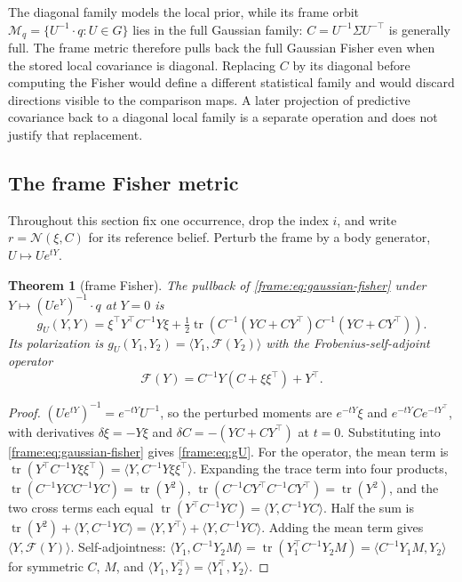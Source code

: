 \documentclass[11pt]{article}
\newtheorem{theorem}{Theorem}[section]
\theoremstyle{definition}
\theoremstyle{remark}
\providecommand{\tr}{\operatorname{tr}}
\providecommand{\Normal}{\mathcal{N}}
\providecommand{\ip}[2]{\langle #1, #2\rangle}
\begin{document}
The diagonal family models the local prior, while its frame orbit \(\mathcal M_q=\{U^{-1}\cdot q:U\in G\}\) lies in the full Gaussian family: \(C=U^{-1}\Sigma U^{-\top}\) is generally full. The frame metric therefore pulls back the full Gaussian Fisher even when the stored local covariance is diagonal. Replacing \(C\) by its diagonal before computing the Fisher would define a different statistical family and would discard directions visible to the comparison maps. A later projection of predictive covariance back to a diagonal local family is a separate operation and does not justify that replacement.

\subsection{The frame Fisher metric}\label{frame:sec:fisher}

Throughout this section fix one occurrence, drop the index $i$, and write $r=\Normal(\xi,C)$ for its reference belief. Perturb the frame by a body generator, $U\mapsto Ue^{tY}$.

\begin{theorem}[frame Fisher]\label{frame:thm:fisher}
The pullback of \eqref{frame:eq:gaussian-fisher} under $Y\mapsto(Ue^{Y})^{-1}\cdot q$ at $Y=0$ is
\begin{equation}\label{frame:eq:gU}
g_U(Y,Y)=\xi^\top Y^\top C^{-1}Y\xi+\tfrac12\tr\left(C^{-1}(YC+CY^\top)C^{-1}(YC+CY^\top)\right).
\end{equation}
Its polarization is $g_U(Y_1,Y_2)=\ip{Y_1}{\mathcal{F}(Y_2)}$ with the Frobenius-self-adjoint operator
\begin{equation}\label{frame:eq:F}
\mathcal{F}(Y)=C^{-1}Y(C+\xi\xi^\top)+Y^\top.
\end{equation}
\end{theorem}
\begin{proof}
$(Ue^{tY})^{-1}=e^{-tY}U^{-1}$, so the perturbed moments are $e^{-tY}\xi$ and $e^{-tY}Ce^{-tY^\top}$, with derivatives $\delta\xi=-Y\xi$ and $\delta C=-(YC+CY^\top)$ at $t=0$. Substituting into \eqref{frame:eq:gaussian-fisher} gives \eqref{frame:eq:gU}. For the operator, the mean term is $\tr(Y^\top C^{-1}Y\xi\xi^\top)=\ip{Y}{C^{-1}Y\xi\xi^\top}$. Expanding the trace term into four products, $\tr(C^{-1}YCC^{-1}YC)=\tr(Y^2)$, $\tr(C^{-1}CY^\top C^{-1}CY^\top)=\tr(Y^2)$, and the two cross terms each equal $\tr(Y^\top C^{-1}YC)=\ip{Y}{C^{-1}YC}$. Half the sum is $\tr(Y^2)+\ip{Y}{C^{-1}YC}=\ip{Y}{Y^\top}+\ip{Y}{C^{-1}YC}$. Adding the mean term gives $\ip{Y}{\mathcal{F}(Y)}$. Self-adjointness: $\ip{Y_1}{C^{-1}Y_2M}=\tr(Y_1^\top C^{-1}Y_2M)=\ip{C^{-1}Y_1M}{Y_2}$ for symmetric $C$, $M$, and $\ip{Y_1}{Y_2^\top}=\ip{Y_1^\top}{Y_2}$.
\end{proof}
\end{document}
